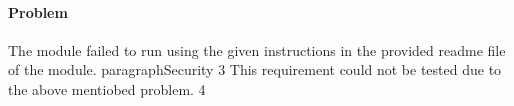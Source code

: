 
\paragraph{Problem }
The module failed to run using the given instructions in the provided readme file of the module.
paragraph{Security} 
3 	This requirement could not be tested due to the above mentiobed problem.  
4 	
